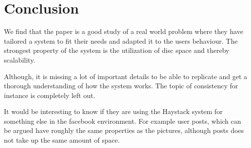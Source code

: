 \section{Conclusion}
We find that the paper is a good study of a real world problem where they have tailored
a system to fit their needs and adapted it to the users behaviour. The strongest property
of the system is the utilization of disc space and thereby scalability. 

Although, it is missing a lot of important details to be able to replicate and get a
thorough understanding of how the system works. The topic of consistency for instance
is completely left out.

It would be interesting to know if they are using the Haystack system for something else in
the facebook environment. For example user posts, which can be argued have roughly the
same properties as the pictures, although posts does not take up the same amount of
space.


